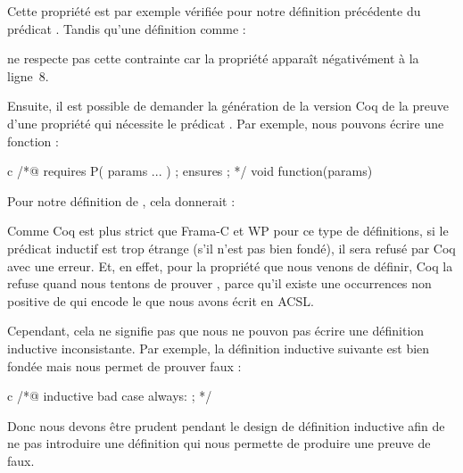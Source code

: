 Cette propriété est par exemple vérifiée pour notre définition précédente du
prédicat . Tandis qu'une définition comme :




ne respecte pas cette contrainte car la propriété 
apparaît négativément à la ligne~8.


Ensuite, il est possible de demander la génération de la version Coq de la
preuve d'une propriété qui nécessite le prédicat . Par exemple,
nous pouvons écrire une fonction :



\begin{CodeBlock}{c}
/*@
  requires P( params ... ) ;
  ensures  \false ;
*/ void function(params){

}
\end{CodeBlock}


Pour notre définition de , cela donnerait :




Comme Coq est plus strict que Frama-C et WP pour ce type de définitions, si
le prédicat inductif est trop étrange (s'il n'est pas bien fondé), il sera
refusé par Coq avec une erreur. Et, en effet, pour la propriété
 que nous venons de définir, Coq la refuse quand
nous tentons de prouver , parce
qu'il existe une occurrences non positive de 
qui encode le  que nous avons écrit en ACSL.





Cependant, cela ne signifie pas que nous ne pouvon pas écrire une définition
inductive inconsistante. Par exemple, la définition inductive suivante est bien
fondée mais nous permet de prouver faux :


\begin{CodeBlock}{c}
/*@
  inductive bad {
    case always: \false ;
  }
*/
\end{CodeBlock}


Donc nous devons être prudent pendant le design de définition inductive afin
de ne pas introduire une définition qui nous permette de produire une preuve de
faux.




